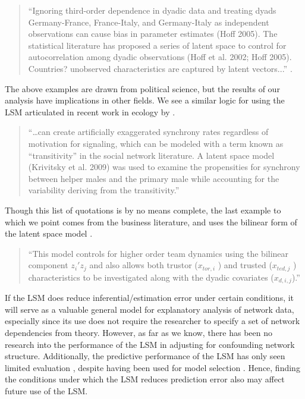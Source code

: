 \documentclass[11pt]{article}
\begin{document}
\begin{quote}
``Ignoring third-order dependence in dyadic data and treating dyads Germany-France, France-Italy, and Germany-Italy as independent observations can cause bias in parameter estimates (Hoff 2005). The statistical literature has proposed a series of latent space to control for autocorrelation among dyadic observations (Hoff et al. 2002; Hoff 2005). Countries? unobserved characteristics are captured by latent vectors...'' \citep[p. 17]{cao2016transnational}.
\end{quote}


The above examples are drawn from political science, but the results of our analysis have implications in other fields. We see a similar logic for using the LSM articulated in recent work in ecology by \citet[p. 989]{nomano2015unrelated}.

\begin{quote}
``\ldots can create artificially exaggerated synchrony rates regardless of motivation for signaling, which can be modeled with a term known as ``transitivity'' in the social network literature. A latent space model (Krivitsky et al. 2009) was used to examine the propensities for synchrony between helper males and the primary male while accounting for the variability deriving from the transitivity.''
\end{quote}


Though this list of quotations is by no means complete, the last example to which we point comes from the business literature, and uses the bilinear form of the latent space model \citep[p. 7]{dass2011impact}. 

\begin{quote}
``This model controls for higher order team dynamics using the bilinear component $z_i'z_j$ and also allows
both trustor ($x_{tor,i}$ ) and trusted ($x_{ted,j}$ ) characteristics to be investigated along with the dyadic covariates ($x_{d,i,j}$).''
\end{quote}


If the LSM does reduce inferential/estimation error under certain conditions, it will serve as a valuable general model for explanatory analysis of network data, especially since its use does not require the researcher to specify a set of network dependencies from theory. However, as far as we know, there has been no research into the performance of the LSM in adjusting for confounding network structure. Additionally, the predictive performance of the LSM has only seen limited evaluation \citep{hoff2002latent}, despite having been used for model selection \citep{ward2013gravity, fletcher2011social, fletcher2013network, chiu2011unifying}. Hence, finding the conditions under which the LSM reduces prediction error also may affect future use of the LSM.
\end{document}
